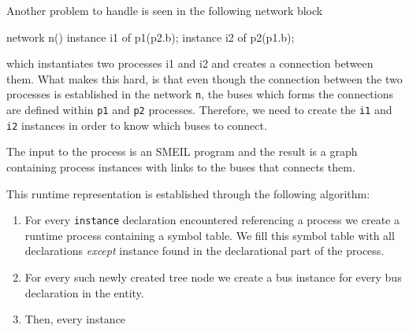 



Another problem to handle is seen in the following network block
\begin{smeilcode}
  network n() {
    instance i1 of p1(p2.b);
    instance i2 of p2(p1.b);
  }
\end{smeilcode}
which instantiates two processes i1 and i2 and creates a connection between
them. What makes this hard, is that even though the connection between the two
processes is established in the network {\tt n}, the buses which forms the
connections are defined within {\tt p1} and {\tt p2} processes. Therefore, we
need to create the {\tt i1} and {\tt i2} instances in order to know which buses
to connect.


The input to the process is an SMEIL program and the result is a graph
containing process instances with links to the buses that connects
them.


This runtime representation is established through the following
algorithm:
\begin{enumerate}
\item For every {\tt instance} declaration encountered referencing a process we
  create a runtime process containing a symbol table. We fill this symbol table
  with all declarations {\itshape except} instance found in the declarational
  part of the process.
    
  \item For every such newly created tree node we create a bus instance for
    every bus declaration in the entity.
  \item Then, every instance 
\end{enumerate}


